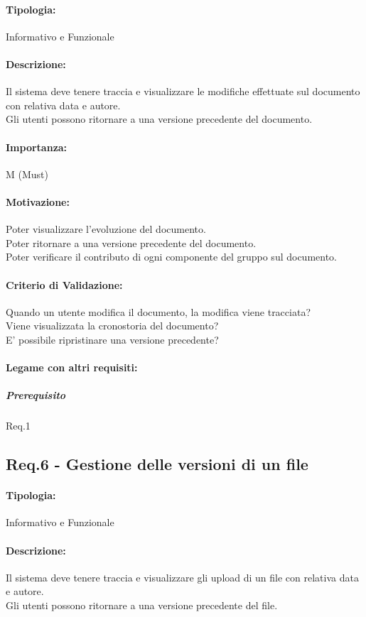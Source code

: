 \paragraph{Tipologia:}
	Informativo e Funzionale %
\paragraph{Descrizione:}
	Il sistema deve tenere traccia e visualizzare le modifiche effettuate sul documento con relativa data e autore.\\
	Gli utenti possono ritornare a una versione precedente del documento.
\paragraph{Importanza:}
	M (Must)
\paragraph{Motivazione:}
	Poter visualizzare l'evoluzione del documento.\\
	Poter ritornare a una versione precedente del documento.\\
	Poter verificare il contributo di ogni componente del gruppo sul documento.
\paragraph{Criterio di Validazione:}
	Quando un utente modifica il documento, la modifica viene tracciata?\\
	Viene visualizzata la cronostoria del documento?\\
	E' possibile ripristinare una versione precedente?
\paragraph{Legame con altri requisiti:}
	\subparagraph{Prerequisito} Req.1


\subsection{Req.6 - Gestione delle versioni di un file}
\paragraph{Tipologia:}
	Informativo e Funzionale %
\paragraph{Descrizione:}
	Il sistema deve tenere traccia e visualizzare gli upload di un file con relativa data e autore.\\
	Gli utenti possono ritornare a una versione precedente del file.
